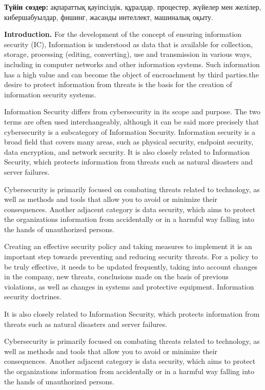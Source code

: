 {\bfseries Түйін сөздер:} ақпараттық қауіпсіздік, құралдар, процестер,
жүйелер мен желілер, кибершабуылдар, фишинг, жасанды интеллект,
машиналық оқыту.

\begin{multicols}{2}
{\bfseries Introduction.} For the development of the concept of ensuring
information security (IC), Information is understood as data that is
available for collection, storage, processing (editing, converting), use
and transmission in various ways, including in computer networks and
other information systems. Such information has a high value and can
become the object of encroachment by third parties.the desire to protect
information from threats is the basis for the creation of information
security systems.

Information Security differs from cybersecurity in its scope and
purpose. The two terms are often used interchangeably, although it can
be said more precisely that cybersecurity is a subcategory of
Information Security. Information security is a broad field that covers
many areas, such as physical security, endpoint security, data
encryption, and network security. It is also closely related to
Information Security, which protects information from threats such as
natural disasters and server failures.

Cybersecurity is primarily focused on combating threats related to
technology, as well as methods and tools that allow you to avoid or
minimize their consequences. Another adjacent category is data security,
which aims to protect the organization\textquotesingle s information
from accidentally or in a harmful way falling into the hands of
unauthorized persons.

Creating an effective security policy and taking measures to implement
it is an important step towards preventing and reducing security
threats. For a policy to be truly effective, it needs to be updated
frequently, taking into account changes in the company, new threats,
conclusions made on the basis of previous violations, as well as changes
in systems and protective equipment. Information security doctrines.

It is also closely related to Information Security, which protects
information from threats such as natural disasters and server failures.

Cybersecurity is primarily focused on combating threats related to
technology, as well as methods and tools that allow you to avoid or
minimize their consequences. Another adjacent category is data security,
which aims to protect the organization\textquotesingle s information
from accidentally or in a harmful way falling into the hands of
unauthorized persons.


\end{multicols}
